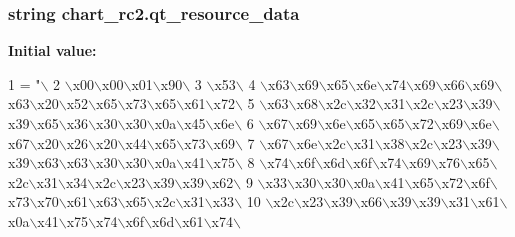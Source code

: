 \subsubsection[{qt\+\_\+resource\+\_\+data}]{\setlength{\rightskip}{0pt plus 5cm}string chart\+\_\+rc2.\+qt\+\_\+resource\+\_\+data}\label{namespacechart__rc2_a4a030a5c5c8cc1bf796bf62fc27bd91a}
{\bfseries Initial value\+:}
\begin{DoxyCode}
1 = \textcolor{stringliteral}{"\(\backslash\)}
2 \textcolor{stringliteral}{\(\backslash\)x00\(\backslash\)x00\(\backslash\)x01\(\backslash\)x90\(\backslash\)}
3 \textcolor{stringliteral}{\(\backslash\)x53\(\backslash\)}
4 \textcolor{stringliteral}{\(\backslash\)x63\(\backslash\)x69\(\backslash\)x65\(\backslash\)x6e\(\backslash\)x74\(\backslash\)x69\(\backslash\)x66\(\backslash\)x69\(\backslash\)x63\(\backslash\)x20\(\backslash\)x52\(\backslash\)x65\(\backslash\)x73\(\backslash\)x65\(\backslash\)x61\(\backslash\)x72\(\backslash\)}
5 \textcolor{stringliteral}{\(\backslash\)x63\(\backslash\)x68\(\backslash\)x2c\(\backslash\)x32\(\backslash\)x31\(\backslash\)x2c\(\backslash\)x23\(\backslash\)x39\(\backslash\)x39\(\backslash\)x65\(\backslash\)x36\(\backslash\)x30\(\backslash\)x30\(\backslash\)x0a\(\backslash\)x45\(\backslash\)x6e\(\backslash\)}
6 \textcolor{stringliteral}{\(\backslash\)x67\(\backslash\)x69\(\backslash\)x6e\(\backslash\)x65\(\backslash\)x65\(\backslash\)x72\(\backslash\)x69\(\backslash\)x6e\(\backslash\)x67\(\backslash\)x20\(\backslash\)x26\(\backslash\)x20\(\backslash\)x44\(\backslash\)x65\(\backslash\)x73\(\backslash\)x69\(\backslash\)}
7 \textcolor{stringliteral}{\(\backslash\)x67\(\backslash\)x6e\(\backslash\)x2c\(\backslash\)x31\(\backslash\)x38\(\backslash\)x2c\(\backslash\)x23\(\backslash\)x39\(\backslash\)x39\(\backslash\)x63\(\backslash\)x63\(\backslash\)x30\(\backslash\)x30\(\backslash\)x0a\(\backslash\)x41\(\backslash\)x75\(\backslash\)}
8 \textcolor{stringliteral}{\(\backslash\)x74\(\backslash\)x6f\(\backslash\)x6d\(\backslash\)x6f\(\backslash\)x74\(\backslash\)x69\(\backslash\)x76\(\backslash\)x65\(\backslash\)x2c\(\backslash\)x31\(\backslash\)x34\(\backslash\)x2c\(\backslash\)x23\(\backslash\)x39\(\backslash\)x39\(\backslash\)x62\(\backslash\)}
9 \textcolor{stringliteral}{\(\backslash\)x33\(\backslash\)x30\(\backslash\)x30\(\backslash\)x0a\(\backslash\)x41\(\backslash\)x65\(\backslash\)x72\(\backslash\)x6f\(\backslash\)x73\(\backslash\)x70\(\backslash\)x61\(\backslash\)x63\(\backslash\)x65\(\backslash\)x2c\(\backslash\)x31\(\backslash\)x33\(\backslash\)}
10 \textcolor{stringliteral}{\(\backslash\)x2c\(\backslash\)x23\(\backslash\)x39\(\backslash\)x66\(\backslash\)x39\(\backslash\)x39\(\backslash\)x31\(\backslash\)x61\(\backslash\)x0a\(\backslash\)x41\(\backslash\)x75\(\backslash\)x74\(\backslash\)x6f\(\backslash\)x6d\(\backslash\)x61\(\backslash\)x74\(\backslash\)}

\end{DoxyCode}
